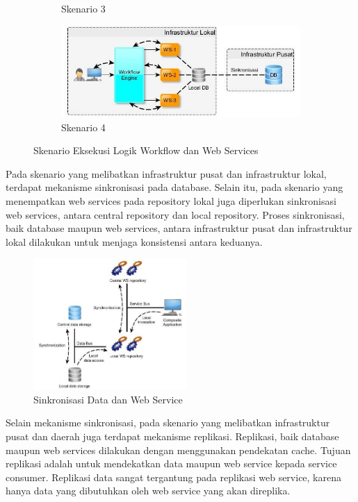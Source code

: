 \begin{figure}[H]
\begin{subfigure}{.5\textwidth}
  		\caption{Skenario 3}
  		\label{fig:design-workflow-webservice-3}
	\end{subfigure}%
	\begin{subfigure}{.5\textwidth}
  		\centering
  		\includegraphics[width=.8\linewidth]{images/design-4}
  		\caption{Skenario 4}
  		\label{fig:design-workflow-webservice-4}
	\end{subfigure}
    \caption{Skenario Eksekusi Logik Workflow dan Web Services}
    \label{fig:design-workflow-webservice}
\end{figure}

Pada skenario yang melibatkan infrastruktur pusat dan infrastruktur lokal, terdapat mekanisme sinkronisasi pada database. Selain itu, pada skenario yang menempatkan web services pada repository lokal juga diperlukan sinkronisasi web services, antara central repository dan local repository. Proses sinkronisasi, baik database maupun web services, antara infrastruktur pusat dan infrastruktur lokal dilakukan untuk menjaga konsistensi antara keduanya.

\begin{figure}[H]
    \centering
    \includegraphics[height=5cm]{images/syncronize}
    \caption{Sinkronisasi Data dan Web Service}
    \label{fig:syncronize}
\end{figure}

Selain mekanisme sinkronisasi, pada skenario yang melibatkan infrastruktur pusat dan daerah juga terdapat mekanisme replikasi. Replikasi, baik database maupun web services dilakukan dengan menggunakan pendekatan cache. Tujuan replikasi adalah untuk mendekatkan data maupun web service kepada service consumer. Replikasi data sangat tergantung pada replikasi web service, karena hanya data yang dibutuhkan oleh web service yang akan direplika.

